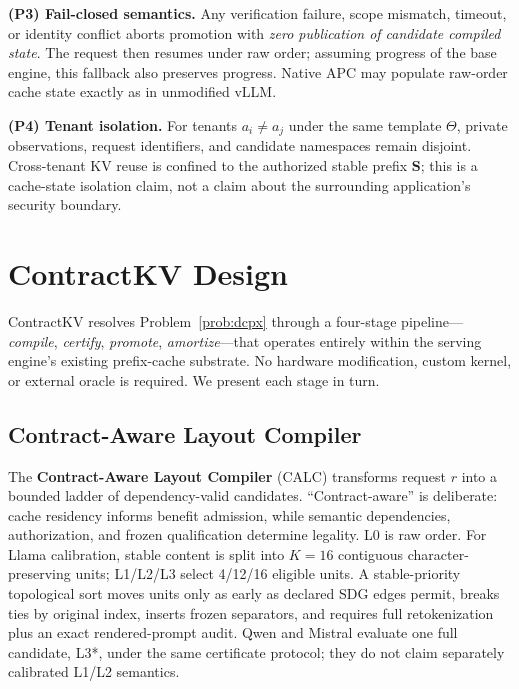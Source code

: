\documentclass[journal]{IEEEtran}
\begin{document}
\noindent\textbf{(P3) Fail-closed semantics.}
Any verification failure, scope mismatch, timeout, or identity conflict aborts promotion with \emph{zero publication of candidate compiled state}. The request then resumes under raw order; assuming progress of the base engine, this fallback also preserves progress. Native APC may populate raw-order cache state exactly as in unmodified vLLM.

\noindent\textbf{(P4) Tenant isolation.}
For tenants $a_i \neq a_j$ under the same template $\Theta$, private observations, request identifiers, and candidate namespaces remain disjoint. Cross-tenant KV reuse is confined to the authorized stable prefix $\mathbf{S}$; this is a cache-state isolation claim, not a claim about the surrounding application's security boundary.

\section{ContractKV Design}
\label{sec:design}

ContractKV resolves Problem~\ref{prob:dcpx} through a four-stage pipeline---\emph{compile}, \emph{certify}, \emph{promote}, \emph{amortize}---that operates entirely within the serving engine's existing prefix-cache substrate. No hardware modification, custom kernel, or external oracle is required. We present each stage in turn.

\subsection{Contract-Aware Layout Compiler}
\label{sec:calc}

The \textbf{Contract-Aware Layout Compiler} (CALC) transforms request $r$ into a bounded ladder of dependency-valid candidates. ``Contract-aware'' is deliberate: cache residency informs benefit admission, while semantic dependencies, authorization, and frozen qualification determine legality. L0 is raw order. For Llama calibration, stable content is split into $K=16$ contiguous character-preserving units; L1/L2/L3 select 4/12/16 eligible units. A stable-priority topological sort moves units only as early as declared SDG edges permit, breaks ties by original index, inserts frozen separators, and requires full retokenization plus an exact rendered-prompt audit. Qwen and Mistral evaluate one full candidate, L3*, under the same certificate protocol; they do not claim separately calibrated L1/L2 semantics.
\end{document}
